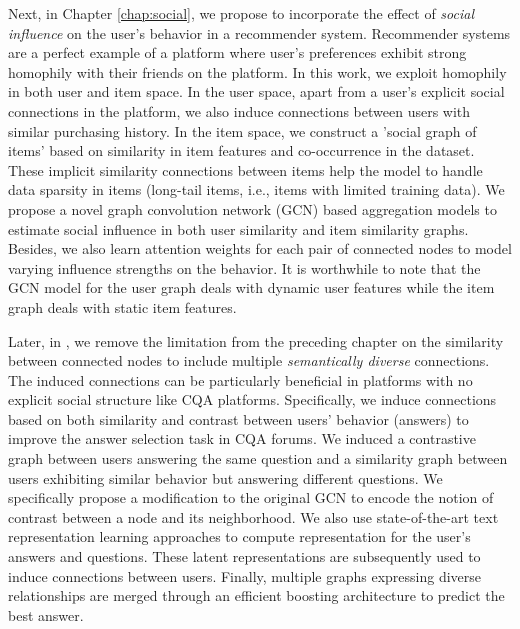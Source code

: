 Next, in Chapter \ref{chap:social}, we propose to incorporate the effect of \emph{social influence} on the user's behavior in a recommender system. Recommender systems are a perfect example of a platform where user's preferences exhibit strong homophily with their friends on the platform. In this work,
we exploit homophily in both user and item space.
In the user space, apart from a user's explicit social connections in the platform, we also induce connections between users with similar purchasing history.
In the item space, we construct a 'social graph of items' based on similarity in item features and co-occurrence in the dataset.
These implicit similarity connections between items help the model to handle data sparsity in items (long-tail items, i.e., items with limited training data).
We propose a novel graph convolution network (GCN) based aggregation models to estimate social influence in both user similarity and item similarity graphs. Besides, we also learn attention weights for each pair of connected nodes to model varying influence strengths on the behavior. It is worthwhile to note that the GCN model for the user graph deals with dynamic user features while the item graph deals with static item features.

Later, in , we remove the limitation from the preceding chapter on the similarity between connected nodes to include multiple \emph{semantically diverse} connections. The induced connections can be particularly beneficial in platforms with no explicit social structure like CQA platforms.
Specifically, we induce connections based on both similarity and contrast between users' behavior (answers) to improve the answer selection task in CQA forums.
We induced a contrastive graph between users answering the same question and a similarity graph between users exhibiting similar behavior but answering different questions. We specifically propose a modification to the original GCN to encode the notion of contrast between a node and its neighborhood.
We also use state-of-the-art text representation learning approaches to compute representation for the user's answers and questions. These latent representations are subsequently used to induce connections between users.
Finally, multiple graphs expressing diverse relationships are merged through an efficient boosting architecture to predict the best answer.

